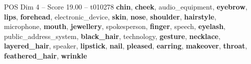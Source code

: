 \begin{textsample}{POS Dim 4 – Score 19.00 – t010278}  \label{ex:f4_pos_024}
\textbf{chin}, \textbf{cheek}, audio\_equipment, \textbf{eyebrow}, \textbf{lips}, \textbf{forehead}, electronic\_device, \textbf{skin}, \textbf{nose}, \textbf{shoulder}, \textbf{hairstyle}, microphone, \textbf{mouth}, \textbf{jewellery}, spokesperson, \textbf{finger}, speech, \textbf{eyelash}, public\_address\_system, \textbf{black\_hair}, technology, \textbf{gesture}, \textbf{necklace}, \textbf{layered\_hair}, speaker, \textbf{lipstick}, \textbf{nail}, \textbf{pleased}, \textbf{earring}, \textbf{makeover}, \textbf{throat}, \textbf{feathered\_hair}, \textbf{wrinkle}

\end{textsample}
